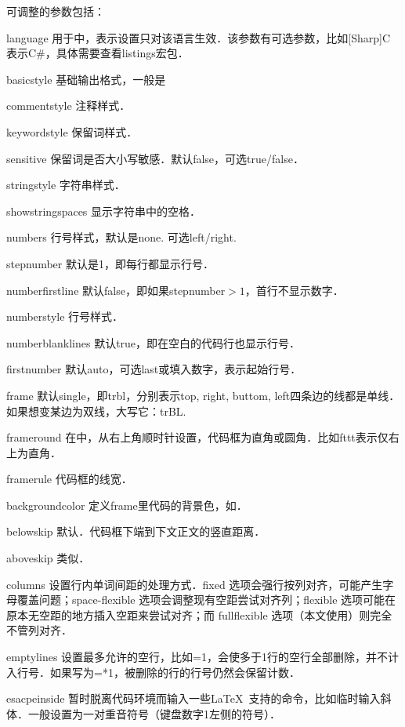 可调整的参数包括：
\begin{para}
\item[language] 用于中，表示设置只对该语言生效．该参数有可选参数，比如[Sharp]C表示C\#，具体需要查看listings宏包．
\item[basicstyle] 基础输出格式，一般是
\item[commentstyle] 注释样式．
\item[keywordstyle] 保留词样式．
\item[sensitive] 保留词是否大小写敏感．默认false，可选true/false．
\item[stringstyle] 字符串样式．
\item[showstringspaces] 显示字符串中的空格．
\item[numbers] 行号样式，默认是none. 可选left/right.
\item[stepnumber] 默认是1，即每行都显示行号．
\item[numberfirstline] 默认false，即如果stepnumber$>1$，首行不显示数字．
\item[numberstyle] 行号样式．
\item[numberblanklines] 默认true，即在空白的代码行也显示行号．
\item[firstnumber] 默认auto，可选last或填入数字，表示起始行号．
\item[frame] 默认single，即trbl，分别表示top, right, buttom, left四条边的线都是单线．如果想变某边为双线，大写它：trBL.
\item[frameround] 在中，从右上角顺时针设置，代码框为直角或圆角．比如fttt表示仅右上为直角．
\item[framerule] 代码框的线宽．
\item[backgroundcolor] 定义frame里代码的背景色，如．
\item[belowskip] 默认．代码框下端到下文正文的竖直距离．
\item[aboveskip] 类似．
\item[columns] 设置行内单词间距的处理方式．fixed 选项会强行按列对齐，可能产生字母覆盖问题；space-flexible 选项会调整现有空距尝试对齐列；flexible 选项可能在原本无空距的地方插入空距来尝试对齐；而 fullflexible 选项（本文使用）则完全不管列对齐．
\item[emptylines] 设置最多允许的空行，比如=1，会使多于1行的空行全部删除，并不计入行号．如果写为=*1，被删除的行的行号仍然会保留计数．
\item[esacpeinside] 暂时脱离代码环境而输入一些\LaTeX\ 支持的命令，比如临时输入斜体．一般设置为一对重音符号（键盘数字1左侧的符号）．
\end{para}

